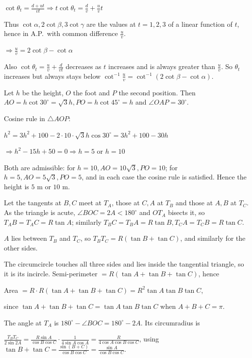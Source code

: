   $\cot\theta_t = \frac{d + ut}{vt}\Rightarrow t\cot\theta_t = \frac{d}{v} + \frac{u}{v}t$

  Thus $\cot\alpha, 2\cot\beta, 3\cot\gamma$ are the values at $t = 1, 2, 3$ of a linear function of $t$,
  hence in A.P.\ with common difference $\frac{u}{v}$.

  $\Rightarrow \frac{u}{v} = 2\cot\beta - \cot\alpha$

  Also $\cot\theta_t = \frac{u}{v} + \frac{d}{vt}$ decreases as $t$ increases and is always greater than
  $\frac{u}{v}$. So $\theta_t$ increases but always stays below $\cot^{-1}\frac{u}{v} = \cot^{-1}(2\cot\beta -
  \cot\alpha)$.
\item Let $h$ be the height, $O$ the foot and $P$ the second position. Then $AO = h\cot30^\circ = \sqrt{3}h,
  PO = h\cot45^\circ = h$ and $\angle OAP = 30^\circ$.

  Cosine rule in $\triangle AOP$:

  $h^2 = 3h^2 + 100 - 2\cdot10\cdot\sqrt{3}h\cos30^\circ = 3h^2 + 100 - 30h$

  $\Rightarrow h^2 - 15h + 50 = 0\Rightarrow h = 5$ or $h = 10$

  Both are admissible: for $h = 10, AO = 10\sqrt{3}, PO = 10$; for $h = 5, AO = 5\sqrt{3}, PO = 5$, and in each
  case the cosine rule is satisfied. Hence the height is $5$ m or $10$ m.
\item Let the tangents at $B, C$ meet at $T_A$, those at $C, A$ at $T_B$ and those at $A, B$ at $T_C$. As
  the triangle is acute, $\angle BOC = 2A < 180^\circ$ and $OT_A$ bisects it, so $T_AB = T_AC = R\tan A$;
  similarly $T_BC = T_BA = R\tan B, T_CA = T_CB = R\tan C$.

  $A$ lies between $T_B$ and $T_C$, so $T_BT_C = R(\tan B + \tan C)$, and similarly for the other sides.

  The circumcircle touches all three sides and lies inside the tangential triangle, so it is its incircle.
  Semi-perimeter $= R(\tan A + \tan B + \tan C)$, hence

  Area $= R\cdot R(\tan A + \tan B + \tan C) = R^2\tan A\tan B\tan C$,

  since $\tan A + \tan B + \tan C = \tan A\tan B\tan C$ when $A + B + C = \pi$.

  The angle at $T_A$ is $180^\circ - \angle BOC = 180^\circ - 2A$. Its circumradius is

  $\frac{T_BT_C}{2\sin2A} = \frac{R\sin A}{\cos B\cos C}\cdot\frac{1}{4\sin A\cos A} = \frac{R}{4\cos A\cos
  B\cos C}$, using $\tan B + \tan C = \frac{\sin(B + C)}{\cos B\cos C} = \frac{\sin A}{\cos B\cos C}$.

